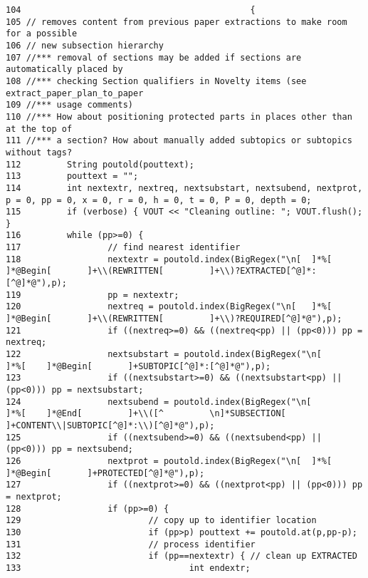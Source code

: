 \footnotesize\begin{verbatim}104                                             {
105 // removes content from previous paper extractions to make room for a possible
106 // new subsection hierarchy
107 //*** removal of sections may be added if sections are automatically placed by
108 //*** checking Section qualifiers in Novelty items (see extract_paper_plan_to_paper
109 //*** usage comments)
110 //*** How about positioning protected parts in places other than at the top of
111 //*** a section? How about manually added subtopics or subtopics without tags?
112         String poutold(pouttext);
113         pouttext = "";
114         int nextextr, nextreq, nextsubstart, nextsubend, nextprot, p = 0, pp = 0, x = 0, r = 0, h = 0, t = 0, P = 0, depth = 0;
115         if (verbose) { VOUT << "Cleaning outline: "; VOUT.flush(); }
116         while (pp>=0) {
117                 // find nearest identifier
118                 nextextr = poutold.index(BigRegex("\n[  ]*%[    ]*@Begin[       ]+\\(REWRITTEN[         ]+\\)?EXTRACTED[^@]*:[^@]*@"),p);
119                 pp = nextextr;
120                 nextreq = poutold.index(BigRegex("\n[   ]*%[    ]*@Begin[       ]+\\(REWRITTEN[         ]+\\)?REQUIRED[^@]*@"),p);
121                 if ((nextreq>=0) && ((nextreq<pp) || (pp<0))) pp = nextreq;
122                 nextsubstart = poutold.index(BigRegex("\n[      ]*%[    ]*@Begin[       ]+SUBTOPIC[^@]*:[^@]*@"),p);
123                 if ((nextsubstart>=0) && ((nextsubstart<pp) || (pp<0))) pp = nextsubstart;
124                 nextsubend = poutold.index(BigRegex("\n[        ]*%[    ]*@End[         ]+\\([^         \n]*SUBSECTION[         ]+CONTENT\\|SUBTOPIC[^@]*:\\)[^@]*@"),p);
125                 if ((nextsubend>=0) && ((nextsubend<pp) || (pp<0))) pp = nextsubend;
126                 nextprot = poutold.index(BigRegex("\n[  ]*%[    ]*@Begin[       ]+PROTECTED[^@]*@"),p);
127                 if ((nextprot>=0) && ((nextprot<pp) || (pp<0))) pp = nextprot;
128                 if (pp>=0) {
129                         // copy up to identifier location
130                         if (pp>p) pouttext += poutold.at(p,pp-p);
131                         // process identifier
132                         if (pp==nextextr) { // clean up EXTRACTED
133                                 int endextr;

\end{verbatim}
